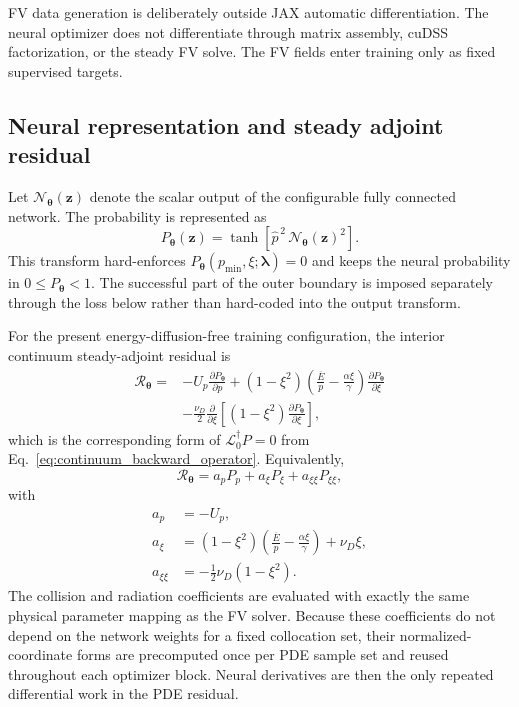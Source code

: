 \documentclass[11pt]{article}
\begin{document}
FV data generation is deliberately outside JAX automatic differentiation.  The neural
optimizer does not differentiate through matrix assembly, cuDSS factorization, or the
steady FV solve.  The FV fields enter training only as fixed supervised targets.

\subsection{Neural representation and steady adjoint residual}
\label{sec:pinn_residual}

Let $\mathcal N_{\bm\theta}(\bm z)$ denote the scalar output of the configurable fully
connected network.  The probability is represented as
\begin{equation}
 \boxed{
 P_{\bm\theta}(\bm z)
 =\tanh\!\left[
   \widehat p^{\,2}\,
   \mathcal N_{\bm\theta}(\bm z)^2
 \right].
 }
 \label{eq:pinn_output_transform}
\end{equation}
This transform hard-enforces
$P_{\bm\theta}(p_{\min},\xi;\bm\lambda)=0$ and keeps the neural probability in
$0\le P_{\bm\theta}<1$.  The successful part of the outer boundary is imposed separately
through the loss below rather than hard-coded into the output transform.

For the present energy-diffusion-free training configuration, the interior continuum
steady-adjoint residual is
\begin{align}
 \mathcal R_{\bm\theta}
 ={}&-U_p\frac{\partial P_{\bm\theta}}{\partial p}
 +(1-\xi^2)
  \left(
   \frac{\overline E}{p}-\frac{\alpha\xi}{\gamma}
  \right)
  \frac{\partial P_{\bm\theta}}{\partial\xi}
 \nonumber\\
 &-\frac{\nu_D}{2}
  \frac{\partial}{\partial\xi}
  \left[
   (1-\xi^2)
   \frac{\partial P_{\bm\theta}}{\partial\xi}
  \right],
 \label{eq:pinn_steady_residual}
\end{align}
which is the corresponding form of
$\mathcal L_0^\dagger P=0$ from
Eq.~\eqref{eq:continuum_backward_operator}.  Equivalently,
\begin{equation}
 \mathcal R_{\bm\theta}
 =a_p P_p+a_\xi P_\xi+a_{\xi\xi}P_{\xi\xi},
 \label{eq:pinn_residual_expanded}
\end{equation}
with
\begin{align}
 a_p&=-U_p,\\
 a_\xi&=(1-\xi^2)
 \left(\frac{\overline E}{p}-\frac{\alpha\xi}{\gamma}\right)
 +\nu_D\xi,\\
 a_{\xi\xi}&=-\frac12\nu_D(1-\xi^2).
 \label{eq:pinn_residual_coefficients}
\end{align}
The collision and radiation coefficients are evaluated with exactly the same physical
parameter mapping as the FV solver.  Because these coefficients do not depend on the
network weights for a fixed collocation set, their normalized-coordinate forms are
precomputed once per PDE sample set and reused throughout each optimizer block.  Neural
derivatives are then the only repeated differential work in the PDE residual.
\end{document}
